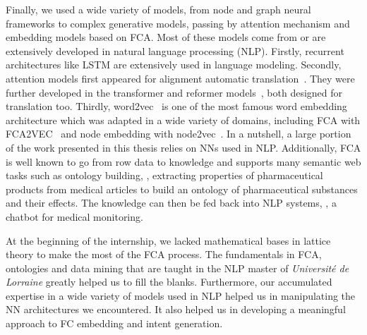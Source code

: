 Finally, we used a wide variety of models, from node and graph neural frameworks to complex generative models, passing by attention mechanism and embedding models based on FCA. Most of these models come from or are extensively developed in natural language processing (NLP). 
Firstly, recurrent architectures like LSTM are extensively used in language modeling.
Secondly, attention models first appeared for alignment automatic translation~\cite{attention:2015:bahdanau}. They were further developed in the transformer and reformer models~\cite{reformer:2020:kitaev,transformer:2017:vaswani}, both designed for translation too.
Thirdly, word2vec~\cite{word2vec:2013:mikolov} is one of the most famous word embedding architecture which was adapted in a wide variety of domains, including FCA with FCA2VEC~\cite{fca2vec:2019:durrschnabel} and node embedding with node2vec~\cite{node2vec:2016:grover}.
In a nutshell, a large portion of the work presented in this thesis relies on NNs used in NLP.
Additionally, FCA is well known to go from row data to knowledge and supports many semantic web tasks such as ontology building, \eg, extracting properties of pharmaceutical products from medical articles to build an ontology of pharmaceutical substances and their effects. The knowledge can then be fed back into NLP systems, \eg, a chatbot for medical monitoring.


At the beginning of the internship, we lacked mathematical bases in lattice theory to make the most of the FCA process.
The fundamentals in FCA, ontologies and data mining that are taught in the NLP master of \textit{Université de Lorraine} greatly helped us to fill the blanks.
Furthermore, our accumulated expertise in a wide variety of models used in NLP helped us in manipulating the NN architectures we encountered.
It also helped us in developing a meaningful approach to FC embedding and intent generation.